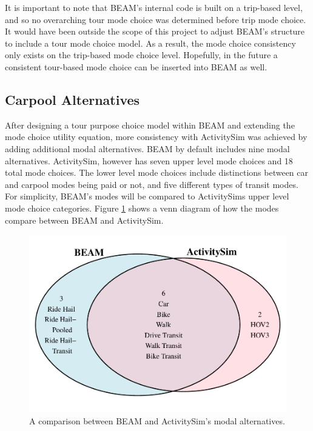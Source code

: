 \documentclass[12pt, oneside, openright]{byuthesis}
\begin{document}
It is important to note that BEAM's internal code is built on a trip-based level, and so no overarching tour mode choice was determined before trip mode choice. It would have been outside the scope of this project to adjust BEAM's structure to include a tour mode choice model. As a result, the mode choice consistency only exists on the trip-based mode choice level. Hopefully, in the future a consistent tour-based mode choice can be inserted into BEAM as well.

\hypertarget{pool}{%
\subsection{Carpool Alternatives}\label{pool}}

After designing a tour purpose choice model within BEAM and extending the mode choice utility equation, more consistency with ActivitySim was achieved by adding additional modal alternatives. BEAM by default includes nine modal alternatives. ActivitySim, however has seven upper level mode choices and 18 total mode choices. The lower level mode choices include distinctions between car and carpool modes being paid or not, and five different types of transit modes. For simplicity, BEAM's modes will be compared to ActivitySims upper level mode choice categories. Figure \ref{fig:venn} shows a venn diagram of how the modes compare between BEAM and ActivitySim.

\begin{figure}

{\centering \includegraphics{thesis_files/figure-latex/venn-1} 

}

\caption{A comparison between BEAM and ActivitySim's modal alternatives.}\label{fig:venn}
\end{figure}
\end{document}
